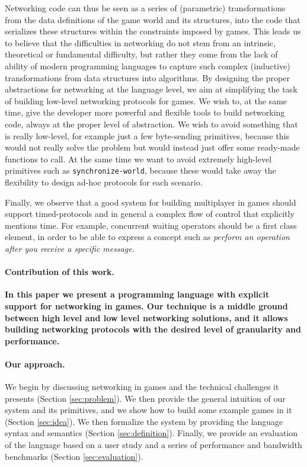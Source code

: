 Networking code can thus be seen as a series of (parametric) transformations from the data definitions of the game world and its structures, into the code that serializes these structures within the constraints imposed by games. This leads us to believe that the difficulties in networking do not stem from an intrinsic, theoretical or fundamental difficulty, but rather they come from the lack of ability of modern programming languages to capture such complex (inductive) transformations from data structures into algorithms. By designing the proper abstractions for networking at the language level, we aim at simplifying the task of building low-level networking protocols for games. We wish to, at the same time, give the developer more powerful and flexible tools to build networking code, always at the proper level of abstraction. We wish to avoid something that is really low-level, for example just a few byte-sending primitives, because this would not really solve the problem but would instead just offer some ready-made functions to call. At the same time we want to avoid extremely high-level primitives such as \texttt{synchronize-world}, because these would take away the flexibility to design ad-hoc protocols for each scenario. 

Finally, we observe that a good system for building multiplayer in games should support timed-protocols and in general a complex flow of control that explicitly mentions time. For example, concurrent waiting operators should be a first class element, in order to be able to express a concept such as \textit{perform an operation after you receive a specific message}.

\paragraph{Contribution of this work.} \textbf{In this paper we present a programming language with explicit support for networking in games. Our technique is a middle ground between high level and low level networking solutions, and it allows building networking protocols with the desired level of granularity and performance.}

\paragraph{Our approach.} We begin by discussing networking in games and the technical challenges it presents (Section \ref{sec:problem}). We then provide the general intuition of our system and its primitives, and we show how to build some example games in it (Section \ref{sec:idea}). We then formalize the system by providing the language syntax and semantics (Section \ref{sec:definition}). Finally, we provide an evaluation of the language based on a user study and a series of performance and bandwidth benchmarks (Section \ref{sec:evaluation}).

